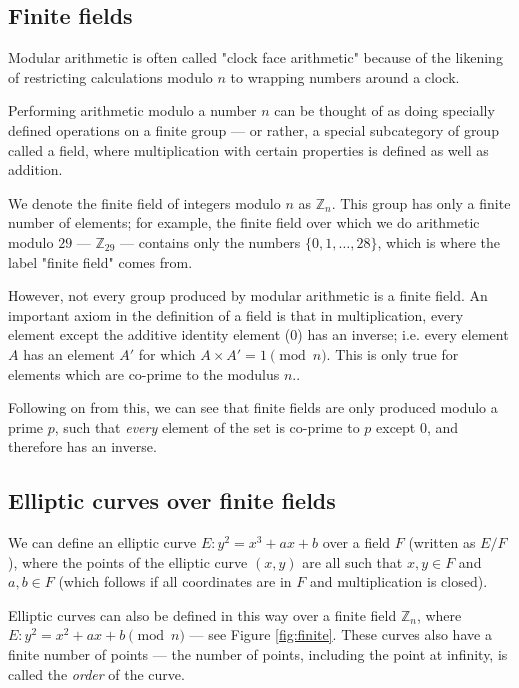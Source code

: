 \documentclass[a4paper]{article}
\begin{document}
\subsection{Finite fields}

Modular arithmetic is often called "clock face arithmetic" because of the likening of restricting calculations modulo $n$ to wrapping numbers around a clock.


Performing arithmetic modulo a number $n$ can be thought of as doing specially defined operations on a finite group --- or rather, a special subcategory of group called a field, where multiplication with certain properties is defined as well as addition.

We denote the finite field of integers modulo $n$ as $\mathbb{Z}_n$. This group has only a finite number of elements; for example, the finite field over which we do arithmetic modulo $29$ --- $\mathbb{Z}_{29}$ --- contains only the numbers $\{0, 1, \dots, 28\}$, which is where the label "finite field" comes from.

However, not every group produced by modular arithmetic is a finite field. An important axiom in the definition of a field is that in multiplication, every element except the additive identity element ($0$) has an inverse; i.e. every element $A$ has an element $A'$ for which $A \times A' = 1 \pmod{n}$. This is only true for elements which are co-prime to the modulus $n$.\cite{discrete}.

Following on from this, we can see that finite fields are only produced modulo a prime $p$, such that \textit{every} element of the set is co-prime to $p$ except $0$, and therefore has an inverse.\cite{discrete}

\subsection{Elliptic curves over finite fields}

We can define an elliptic curve $E: y^2 = x^3 + ax + b$ over a field $F$ (written as $E/F$), where the points of the elliptic curve $(x, y)$ are all such that $x, y \in F$ and $a, b \in F$ (which follows if all coordinates are in $F$ and multiplication is closed).

Elliptic curves can also be defined in this way over a finite field $\mathbb{Z}_n$, where $E: y^2 = x^2 + ax + b \pmod n$ --- see Figure \ref{fig:finite}. These curves also have a finite number of points --- the number of points, including the point at infinity, is called the \textit{order} of the curve.\cite{guide}
\end{document}
